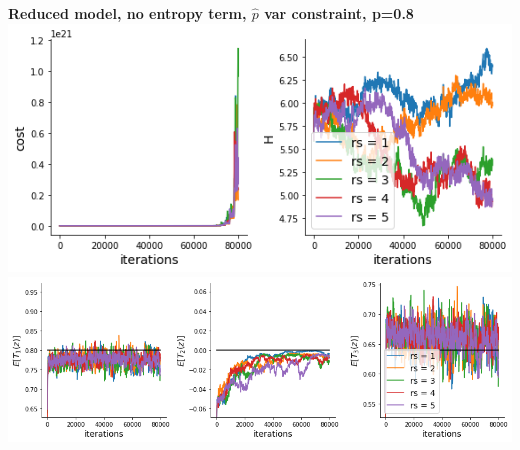 \documentclass[11pt]{article}
\begin{document}
\begin{center}
\textbf{Reduced model, no entropy term, $\hat{p}$ var constraint, p=0.8} \\
\includegraphics[scale=0.6]{figs/cost_H_SC_pvar_reduced_c=0_p=80.png} \\
\includegraphics[scale=0.6]{figs/constraints_SC_pvar_reduced_c=0_p=80.png}
\end{center}
\end{document}
